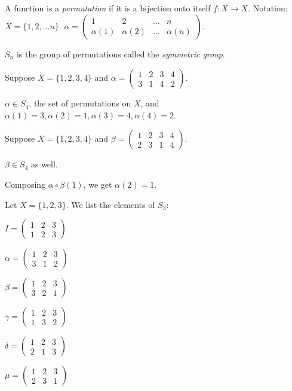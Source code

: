 \begin{defn}
	A function is a \emph{permutation} if it is a bijection onto itself $f: X \rightarrow X$.  Notation: $X = \{ 1, 2, ... n \}$.  $\alpha = \left(
	\begin{matrix}
	1&2&...&n\\
	\alpha(1)&\alpha(2)&...&\alpha(n)
	\end{matrix} \right)$.
\end{defn}

\begin{defn}
	$S_n$ is the group of permutations called the \emph{symmetric group}.
\end{defn}

\begin{ex}
	Suppose $X = \{ 1, 2, 3, 4\}$ and $\alpha = \left(
	\begin{matrix}
	1&2&3&4\\
	3&1&4&2
	\end{matrix} \right)$.
	
	$\alpha \in S_4$, the set of permutations on $X$, and $\alpha(1) = 3, \alpha (2) = 1, \alpha(3) = 4, \alpha (4) = 2$.
	
	Suppose $X = \{ 1, 2, 3, 4\}$ and $\beta = \left(
	\begin{matrix}
	1&2&3&4\\
	2&3&1&4
	\end{matrix} \right)$.
	
	$\beta \in S_4$ as well.
	
	Composing $\alpha \circ \beta(1)$, we get $\alpha(2) = 1$.
\end{ex}

\begin{ex}
	Let $X = \{1,2,3\}$.  We list the elements of $S_3$:
	
	$I = \left( \begin{matrix}
	1&2&3\\
	1&2&3
	\end{matrix} \right)$
	
	$\alpha = \left( \begin{matrix}
	1&2&3\\
	3&1&2
	\end{matrix} \right)$
	
	$\beta = \left( \begin{matrix}
	1&2&3\\
	3&2&1
	\end{matrix} \right)$
	
	$\gamma = \left( \begin{matrix}
	1&2&3\\
	1&3&2
	\end{matrix} \right)$
	
	$\delta = \left( \begin{matrix}
	1&2&3\\
	2&1&3
	\end{matrix} \right)$
	
	$\mu = \left( \begin{matrix}
	1&2&3\\
	2&3&1
	\end{matrix} \right)$
\end{ex}

